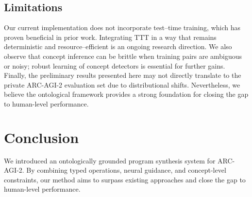 \documentclass{article}
\begin{document}
\subsection{Limitations}
Our current implementation does not incorporate test--time training, which has proven beneficial in prior work\cite{akyurek2024ttt}.  Integrating TTT in a way that remains deterministic and resource--efficient is an ongoing research direction.  We also observe that concept inference can be brittle when training pairs are ambiguous or noisy; robust learning of concept detectors is essential for further gains.  Finally, the preliminary results presented here may not directly translate to the private ARC-AGI-2 evaluation set due to distributional shifts.  Nevertheless, we believe the ontological framework provides a strong foundation for closing the gap to human-level performance.
\section{Conclusion}
We introduced an ontologically grounded program synthesis system for ARC-AGI-2. By combining typed operations, neural guidance, and concept-level constraints, our method aims to surpass existing approaches and close the gap to human-level performance.


\end{document}
